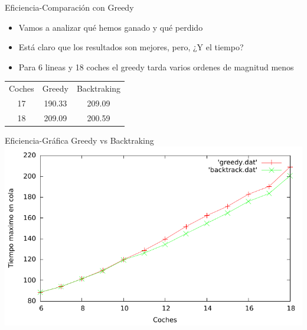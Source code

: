 \begin{frame}{Eficiencia-Comparación con Greedy}
	\begin{itemize}
		\item Vamos a analizar qué hemos ganado y qué perdido
		\pause
		\item Está claro que los resultados son mejores, pero, ¿Y el tiempo?
		\pause
		\item Para 6 lineas y 18 coches el greedy tarda varios ordenes de magnitud menos

	\end{itemize}
	\begin{center}
			\begin{tabular}{c|c|c}
				Coches	& Greedy  & Backtraking  \\ 
				17	& 190.33 &  209.09\\ 
				18	& 209.09 & 200.59
			\end{tabular}
			
	\end{center}

\end{frame}

\begin{frame}{Eficiencia-Gráfica Greedy vs Backtraking}
	\includegraphics[width = \linewidth]{./img/comp.pdf}
\end{frame}




